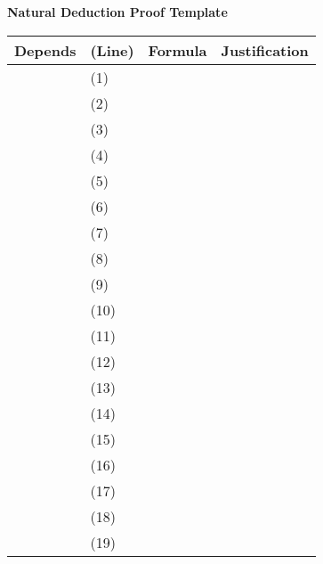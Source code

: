 \documentclass[11pt]{article}
\begin{document}
\thispagestyle{empty}

\noindent\textbf{Natural Deduction Proof Template}

\bigskip

\noindent\begin{tabular}{
  >{\raggedright\arraybackslash}p{2.5cm}!{\vrule width 0.3pt}
  >{\centering\arraybackslash}p{1cm}!{\vrule width 0.3pt}
  >{\raggedright\arraybackslash}p{11cm}!{\vrule width 0.3pt}
  >{\raggedright\arraybackslash}p{2.5cm}
}
\textbf{Depends} & \textbf{(Line)} & \textbf{Formula} & \textbf{Justification} \\
\hline
& (1) &  &  \\
\hline
& (2) &  &  \\
\hline
& (3) &  &  \\
\hline
& (4) &  &  \\
\hline
& (5) &  &  \\
\hline
& (6) &  &  \\
\hline
& (7) &  &  \\
\hline
& (8) &  &  \\
\hline
& (9) &  &  \\
\hline
& (10) &  &  \\
\hline
& (11) &  &  \\
\hline
& (12) &  &  \\
\hline
& (13) &  &  \\
\hline
& (14) &  &  \\
\hline
& (15) &  &  \\
\hline
& (16) &  &  \\
\hline
& (17) &  &  \\
\hline
& (18) &  &  \\
\hline
& (19) &  &  \\
\hline           
\end{tabular}
\end{document}
